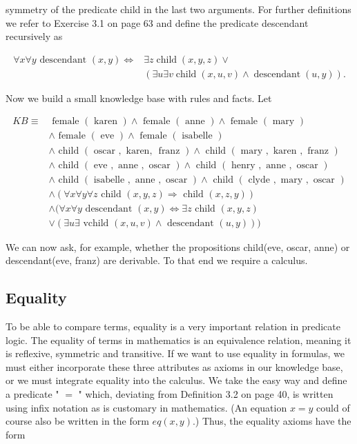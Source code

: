 \documentclass[10pt]{book}
\begin{document}
symmetry of the predicate child in the last two arguments. For further definitions we refer to Exercise 3.1 on page 63 and define the predicate descendant recursively as

$$
\begin{aligned}
\forall x \forall y \text { descendant }(x, y) \Leftrightarrow & \exists z \operatorname{child}(x, y, z) \vee \\
& (\exists u \exists v \operatorname{child}(x, u, v) \wedge \operatorname{descendant}(u, y)) .
\end{aligned}
$$

Now we build a small knowledge base with rules and facts. Let

$$
\begin{aligned}
K B \equiv & \text { female }(\text { karen }) \wedge \text { female }(\text { anne }) \wedge \text { female }(\text { mary }) \\
& \wedge \text { female }(\text { eve }) \wedge \text { female }(\text { isabelle }) \\
& \wedge \text { child }(\text { oscar }, \text { karen, } \text { franz }) \wedge \text { child }(\text { mary }, \text { karen }, \text { franz }) \\
& \wedge \text { child }(\text { eve }, \text { anne }, \text { oscar }) \wedge \text { child }(\text { henry }, \text { anne }, \text { oscar }) \\
& \wedge \text { child }(\text { isabelle }, \text { anne }, \text { oscar }) \wedge \text { child }(\text { clyde }, \text { mary }, \text { oscar }) \\
& \wedge(\forall x \forall y \forall z \text { child }(x, y, z) \Rightarrow \text { child }(x, z, y)) \\
& \wedge(\forall x \forall y \text { descendant }(x, y) \Leftrightarrow \exists z \text { child }(x, y, z) \\
& \vee(\exists u \exists \text { vchild }(x, u, v) \wedge \text { descendant }(u, y)))
\end{aligned}
$$

We can now ask, for example, whether the propositions child(eve, oscar, anne) or descendant(eve, franz) are derivable. To that end we require a calculus.

\subsection{Equality}
To be able to compare terms, equality is a very important relation in predicate logic. The equality of terms in mathematics is an equivalence relation, meaning it is reflexive, symmetric and transitive. If we want to use equality in formulas, we must either incorporate these three attributes as axioms in our knowledge base, or we must integrate equality into the calculus. We take the easy way and define a predicate " $=$ " which, deviating from Definition 3.2 on page 40, is written using infix notation as is customary in mathematics. (An equation $x=y$ could of course also be written in the form $e q(x, y)$.) Thus, the equality axioms have the form
\end{document}
